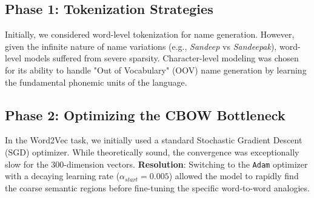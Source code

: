 \documentclass[12pt,a4paper]{article}
\begin{document}
\subsection{Phase 1: Tokenization Strategies}
Initially, we considered word-level tokenization for name generation. However, given the infinite nature of name variations (e.g., \textit{Sandeep} vs \textit{Sandeepak}), word-level models suffered from severe sparsity. Character-level modeling was chosen for its ability to handle "Out of Vocabulary" (OOV) name generation by learning the fundamental phonemic units of the language.

\subsection{Phase 2: Optimizing the CBOW Bottleneck}
In the Word2Vec task, we initially used a standard Stochastic Gradient Descent (SGD) optimizer. While theoretically sound, the convergence was exceptionally slow for the 300-dimension vectors.
\textbf{Resolution}: Switching to the \texttt{Adam} optimizer with a decaying learning rate ($\alpha_{start} = 0.005$) allowed the model to rapidly find the coarse semantic regions before fine-tuning the specific word-to-word analogies.
\end{document}
